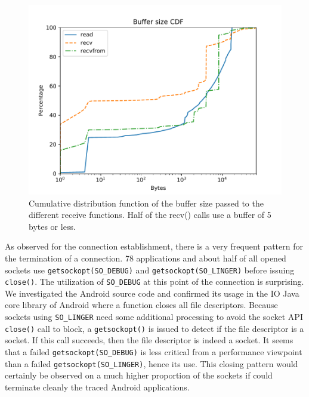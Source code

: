 \begin{figure}
\centering
\includegraphics[width=\columnwidth]{figures/recv_buffers_log}
\caption{Cumulative distribution function of the buffer size passed to the
        different receive functions. Half of the recv() calls use a buffer of 5
        bytes or less.}
\label{fig:recv_buffers}
\end{figure}

As observed for the connection establishment, there is a very frequent pattern
for the termination of a connection. 78 applications and about half of all
opened sockets use \texttt{getsockopt(SO\_DEBUG)} and
\texttt{getsockopt(SO\_LINGER)} before issuing \texttt{close()}. The
utilization of \texttt{SO\_DEBUG} at this point of the connection is
surprising. We investigated the Android source code and confirmed its usage in
the IO Java core library of Android \cite{aosp_blockguardos} where a function
closes all file descriptors. Because sockets using \texttt{SO\_LINGER} need
some additional processing to avoid the socket API \texttt{close()} call to
block, a \texttt{getsockopt()} is issued to detect if the file descriptor is a
socket. If this call succeeds, then the file descriptor is indeed a socket.
It seems that a failed \texttt{getsockopt(SO\_DEBUG)} is less critical from a
performance viewpoint than a failed \texttt{getsockopt(SO\_LINGER)},
hence its use. This closing pattern would certainly be observed
on a much higher proportion of the sockets if \tcpsnitch
could terminate cleanly the traced Android applications.

